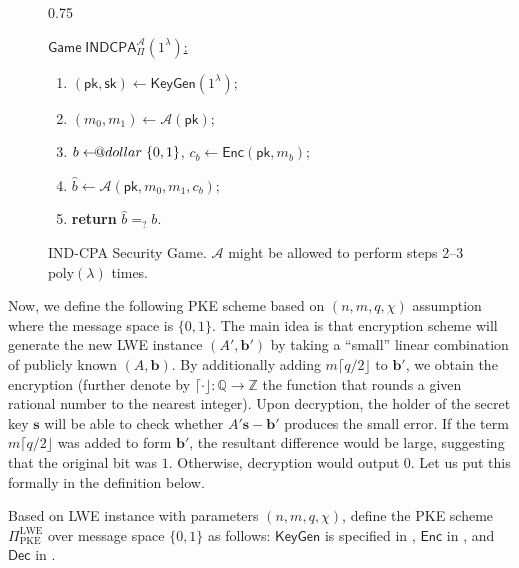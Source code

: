 \documentclass{template}
\makeatletter
\newcommand\leftarrowS{\leftarrow\joinrel\smalldollar}
\newcommand{\smalldollar}{\mathrel{\mathpalette\small@dollar\relax}}
\newcommand{\small@dollar}[2]{%
  \vcenter{\hbox{%
    $#1\textnormal{\fontsize{0.7\dimexpr\f@size pt}{0}\selectfont\$}$%
  }}%
}
\makeatother
\begin{document}
\begin{figure}[ht]
\centering
\begin{varwidth}{0.75\linewidth}
\begin{mdframed}[linecolor=black, linewidth=1pt,
                    skipabove=10pt, skipbelow=10pt]
\colorbox{green!10}{\underline{$\mathsf{Game} \; \mathsf{INDCPA}_{\Pi}^{\mathcal{A}}(1^{\lambda})$:}}
    \begin{enumerate}
        \item $(\mathsf{pk},\mathsf{sk}) \gets \mathsf{KeyGen}(1^{\lambda})$;
        \item $(m_0,m_1) \gets \mathcal{A}(\mathsf{pk})$;
        \item $b \leftarrowS \{0,1\}$, $c_b \gets \mathsf{Enc}(\mathsf{pk}, m_b)$;
        \item $\widehat{b} \gets \mathcal{A}(\mathsf{pk}, m_0, m_1, c_b)$;
        \item \textbf{return} $\widehat{b} =_? b$.
    \end{enumerate}
\end{mdframed}
\end{varwidth}
\caption{IND-CPA Security Game. $\mathcal{A}$ might be
allowed to perform steps 2--3 $\text{poly}(\lambda)$ times.} 
\label{fig:ind-cpa-game}
\end{figure}

Now, we define the following PKE scheme based on $(n,m,q,\chi)$ assumption where
the message space is $\{0,1\}$. The main idea is that encryption scheme will
generate the new LWE instance $(A',\mathbf{b}')$ by taking a ``small'' linear
combination of publicly known $(A,\mathbf{b})$. By additionally adding
$m\lceil q/2 \rfloor$ to $\mathbf{b}'$, we obtain the encryption (further denote
by $\lceil \cdot \rfloor: \mathbb{Q} \to \mathbb{Z}$ the function that rounds a
given rational number to the nearest integer). Upon decryption, the holder of 
the secret key $\mathbf{s}$ will be able to check whether $A'\mathbf{s}-\mathbf{b}'$
produces the small error. If the term $m\lceil q/2 \rfloor$ was added to form 
$\mathbf{b}'$, the resultant difference would be large, suggesting that the original 
bit was $1$. Otherwise, decryption would output $0$. Let us put this formally in 
the definition below.

\begin{definition}\label{def:lwe-pke}
    Based on LWE instance with parameters $(n,m,q,\chi)$, define the PKE scheme
    $\Pi_{\text{PKE}}^{\text{LWE}}$ over message space $\{0,1\}$ as follows: $\mathsf{KeyGen}$ is specified in
    , $\mathsf{Enc}$ in , and $\mathsf{Dec}$
    in .
\end{definition}
\end{document}
